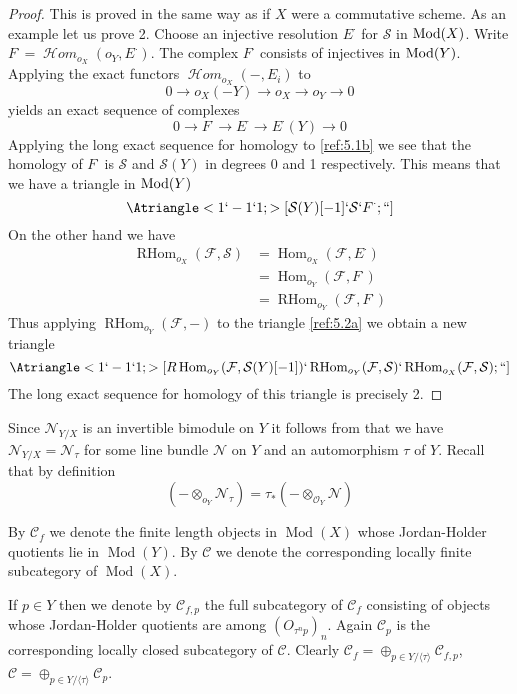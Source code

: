 \documentclass{amsproc}
\def\Cscr{{\mathcal C}}
\def\Fscr{{\mathcal F}}
\def\Hscr{{\mathcal H}}
\def\Nscr{{\mathcal N}}
\def\Oscr{{\mathcal O}}
\def\Sscr{{\mathcal S}}
\def\HHom{\operatorname {\Hscr \mathit{om}}}
\def\Mod{\mathop{\text{Mod}}}
\def\Hom{\operatorname {Hom}}
\def\RHom{\operatorname {RHom}}
\def\HHom{\operatorname {\Hscr \mathit{om}}}
\def\Qch{\operatorname {Mod}}
\def\r{\rightarrow}
\let\oldtext\text
\def\text#1{\oldtext{\upshape #1}}
\theoremstyle{definition}
\theoremstyle{remark}
\numberwithin{equation}{section}
\numberwithin{table}{section}
\numberwithin{figure}{section}
\begin{document}
\begin{proof} This is proved  in the same way as if $X$ were a
  commutative scheme. As an example let us prove 2.  Choose an
  injective resolution $E^\cdot$ for $\Sscr$ in $\Mod(X)$. Write
  $F^\cdot=\HHom_{o_X}(o_Y,E^\cdot)$. The complex $F^\cdot$ consists
  of injectives in $\Mod(Y)$. Applying the exact functors
  $\HHom_{o_X}(-,E_i)$ to
\[
0\r o_X(-Y)\r o_X\r o_Y\r 0
\]
yields an exact sequence of complexes
\begin{equation}
\label{ref:5.1b}
0\r  F^\cdot \r E^\cdot \r E^\cdot(Y)\r 0
\end{equation}
Applying the long exact sequence for homology to
\eqref{ref:5.1b} we see that the homology of
 $F^\cdot$ is $\Sscr$ and $\Sscr(Y)$ in degrees
0 and 1 respectively. This means that we have a triangle in $\Mod(Y)$
\begin{equation}
\label{ref:5.2a}
\Atriangle<1`-1`1; >[\Sscr(Y)[-1]`
\Sscr`F^\cdot;``]
\end{equation}
On the other hand we have
\begin{align*}
\RHom_{o_X}(\Fscr,\Sscr)&=\Hom_{o_X}(\Fscr,E^\cdot)\\
&=\Hom_{o_Y}(\Fscr,F^\cdot)\\
&=\RHom_{o_Y}(\Fscr,F^\cdot)
\end{align*}
Thus applying $\RHom_{o_Y}(\Fscr,-)$ to the triangle
\eqref{ref:5.2a} we obtain a new triangle
\begin{equation}
\Atriangle<1`-1`1; >[R\Hom_{o_Y}(\Fscr,\Sscr(Y)[-1])`\RHom_{o_Y}(\Fscr,\Sscr)
`\RHom_{o_X}(\Fscr,\Sscr);``]
\end{equation}
The long exact sequence for homology of this triangle is precisely 2.
\end{proof}




Since $\Nscr_{Y/X}$ is an invertible bimodule on $Y$ it follows from
\cite[Prop. 6.8]{AZ} that we have $\Nscr_{Y/X}=\Nscr_\tau$ for some line
bundle $\Nscr$ on $Y$ and an automorphism $\tau$ of $Y$. Recall that
by definition
\begin{equation}
\label{ref:5.4a}
(-\otimes_{o_Y} \Nscr_\tau)=\tau_\ast(-\otimes_{\Oscr_Y}\Nscr)
\end{equation}
 
 By $\Cscr_f$ we denote the finite length objects in $\Qch(X)$ whose
 Jordan-Holder quotients lie in $\Qch(Y)$. By $\Cscr$ we denote the
 corresponding locally finite subcategory of $\Qch(X)$.
 
 If $p\in Y$ then we denote by $\Cscr_{f,p}$ the full subcategory of
 $\Cscr_f$ consisting of objects whose Jordan-Holder quotients are among
 $(O_{\tau^np})_n$. Again $\Cscr_p$ is the corresponding locally closed
 subcategory of $\Cscr$. Clearly $\Cscr_f=\oplus_{p\in
 Y/\langle\tau\rangle}\Cscr_{f,p}$, $\Cscr=\oplus_{p\in
 Y/\langle\tau\rangle}\Cscr_p$. 
 
\end{document}
